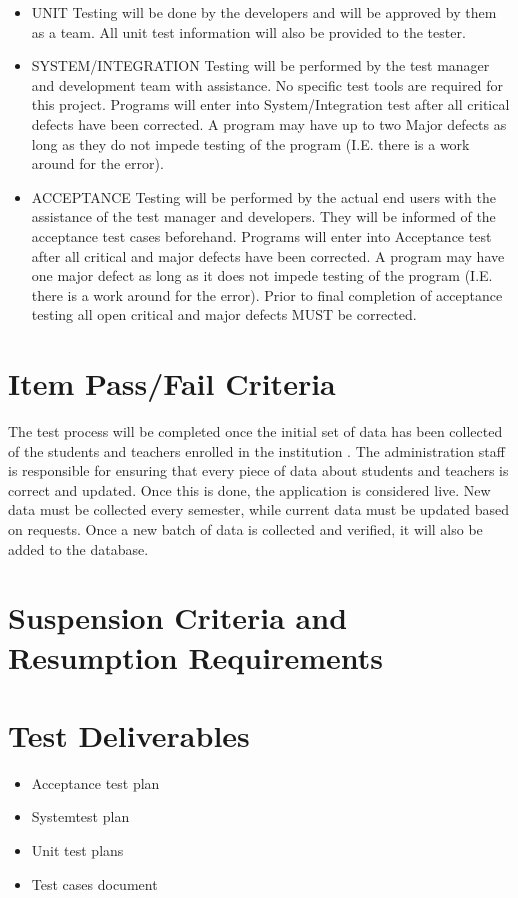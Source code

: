 \documentclass{scrreprt}
\begin{document}
\begin{itemize}
    \item UNIT Testing will be done by the developers and will be approved by them as a team. All unit test information will also be provided to the tester.
    \item SYSTEM/INTEGRATION Testing will be performed by the test manager and development team with assistance. No specific test tools are required for this project. Programs will enter into System/Integration test after all critical defects have been corrected. A program may have up to two Major defects as long as they do not impede testing of the program (I.E. there is a work around for the error).
    \item ACCEPTANCE Testing will be performed by the actual end users with the assistance of the test manager and developers. They will be informed of the acceptance test cases beforehand. Programs will enter into Acceptance test after all critical and major defects have been corrected. A program may have one major defect as long as it does not impede testing of the program (I.E. there is a work around for the error). Prior to final completion of acceptance testing all open critical and major defects MUST be corrected.
\end{itemize}


\chapter{Item Pass/Fail Criteria}
The test process will be completed once the initial set of data has been collected of the students and teachers enrolled in the institution . The administration staff is responsible for ensuring that every piece of data about students and teachers is correct and updated. Once this is done, the application is considered live. New data must be collected every semester, while current data must be updated based on requests. Once a new batch of data is collected and verified, it will also be added to the database.

\chapter{Suspension Criteria and Resumption Requirements}

\chapter{Test Deliverables}
\begin{itemize}
    \item Acceptance test plan
    \item System\Integration test plan
    \item Unit test plans
    \item Test cases document
\end{itemize}
\end{document}
